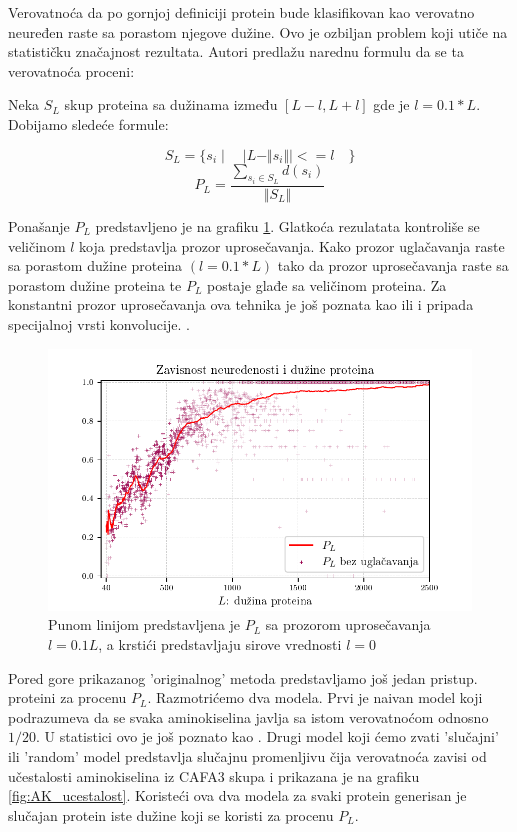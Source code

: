 Verovatnoća da po gornjoj definiciji protein bude klasifikovan kao verovatno
neuređen raste sa porastom njegove dužine. Ovo je ozbiljan problem koji utiče
na statističku značajnost rezultata. Autori \parencite{Xie2007} 
predlažu narednu formulu da se ta verovatnoća proceni:

Neka $S_L$ skup proteina sa dužinama između $[L-l, L+l]$ gde je $l
= 0.1*L$. Dobijamo sledeće formule:

$$ S_L = \{s_i \mid \quad | L -  \Vert s_i \Vert | <= l \quad   \}$$
$$ P_L = \dfrac{ \sum_{s_i \in S_L} d(s_i)} {\Vert S_L \Vert}$$

Ponašanje $P_L$ predstavljeno je na grafiku \ref{fig:PL1}. Glatkoća rezulatata
kontroliše se veličinom $l$ koja predstavlja prozor uprosečavanja. Kako prozor
uglačavanja raste sa porastom dužine proteina $(l = 0.1*L)$
tako da prozor uprosečavanja raste sa porastom dužine proteina te $P_L$
postaje glađe sa veličinom proteina. Za konstantni prozor uprosečavanja ova
tehnika je još poznata kao  ili  i
pripada specijalnoj vrsti konvolucije. .


\begin{figure}[th]
\centering
\includegraphics[]{plots/PL_F}
\decoRule
\caption {
 Punom linijom predstavljena je $P_L$ sa prozorom uprosečavanja $l = 0.1L$,
 a krstići predstavljaju sirove vrednosti $l = 0$ 
}
\label{fig:PL1}
\end{figure}


Pored gore prikazanog 'originalnog' metoda predstavljamo još jedan pristup.
  proteini za procenu $P_L$.
Razmotrićemo dva modela. Prvi je naivan model 
koji podrazumeva da se svaka aminokiselina javlja sa istom verovatnoćom odnosno
$1/20$. U statistici ovo je još poznato kao .  Drugi
model koji ćemo zvati 'slučajni' ili 'random' model predstavlja slučajnu
promenljivu čija verovatnoća zavisi od učestalosti aminokiselina iz CAFA3 skupa
i prikazana je na grafiku \ref{fig:AK_ucestalost}.  Koristeći ova dva modela za
svaki protein generisan je slučajan protein iste dužine koji se koristi za
procenu $P_L$.


